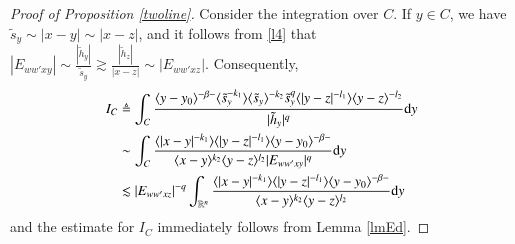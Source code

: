 \documentclass[11pt,reqno]{amsart}
\def\d{{\rm d}}
\numberwithin{equation}{section}
\theoremstyle{definition}
\begin{document}
\begin{appendix}
\begin{proof}[Proof of Proposition \ref{twoline}]
		Consider the integration over $C$. If $y\in C$, we have $\tilde{s}_y\sim|x-y|\sim|x-z|$, and it follows from \eqref{l4} that $|E_{ww'xy}|\sim\frac{|\tilde{h}_y|}{\tilde{s}_y}\gtrsim\frac{|\tilde{h}_z|}{|x-z|}\sim|E_{ww'xz}|$. Consequently,
		\begin{equation}\label{l23}
			\begin{split}
				I_C&\triangleq\int_C\frac{\langle y-y_0\rangle^{-\beta-}\langle\tilde{s}_y^{-k_1}\rangle\langle\tilde{s}_y\rangle^{-k_2}\tilde{s}_y^q\langle|y-z|^{-l_1}\rangle\langle y-z\rangle^{-l_2}}{|\tilde{h}_y|^q}\d y\\
				&\sim\int_C\frac{\langle|x-y|^{-k_1}\rangle\langle|y-z|^{-l_1}\rangle\langle y-y_0\rangle^{-\beta-}}{\langle x-y\rangle^{k_2}\langle y-z\rangle^{l_2}|E_{ww'xy}|^q}\d y\\
				&\lesssim|E_{ww'xz}|^{-q}\int_{\mathbb{R}^n}\frac{\langle|x-y|^{-k_1}\rangle\langle|y-z|^{-l_1}\rangle\langle y-y_0\rangle^{-\beta-}}{\langle x-y\rangle^{k_2}\langle y-z\rangle^{l_2}}\d y
			\end{split}
		\end{equation}
		and the estimate for $I_C$ immediately follows from Lemma \ref{lmEd}.
		

\end{proof}
\end{appendix}
\end{document}
